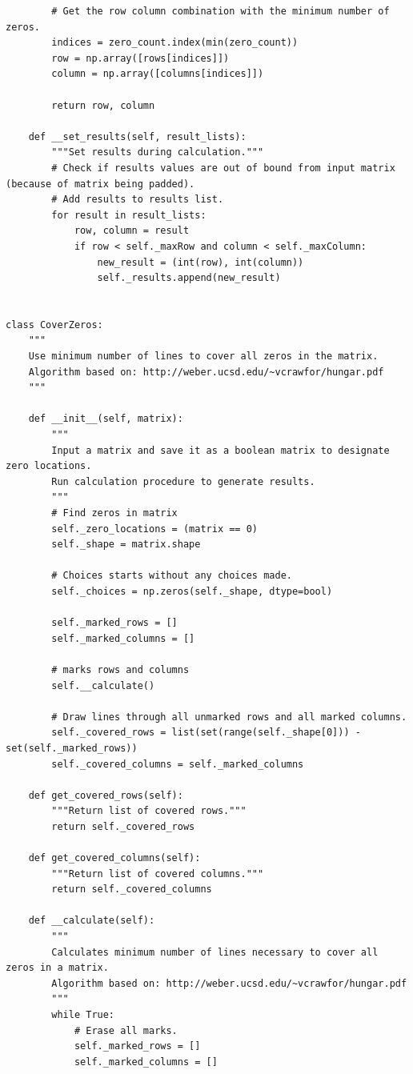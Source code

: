 \documentclass[12pt, letterpaper, twoside]{book}
\begin{document}
\begin{lstlisting}
        # Get the row column combination with the minimum number of zeros.
        indices = zero_count.index(min(zero_count))
        row = np.array([rows[indices]])
        column = np.array([columns[indices]])

        return row, column

    def __set_results(self, result_lists):
        """Set results during calculation."""
        # Check if results values are out of bound from input matrix (because of matrix being padded).
        # Add results to results list.
        for result in result_lists:
            row, column = result
            if row < self._maxRow and column < self._maxColumn:
                new_result = (int(row), int(column))
                self._results.append(new_result)


class CoverZeros:
    """
    Use minimum number of lines to cover all zeros in the matrix.
    Algorithm based on: http://weber.ucsd.edu/~vcrawfor/hungar.pdf
    """

    def __init__(self, matrix):
        """
        Input a matrix and save it as a boolean matrix to designate zero locations.
        Run calculation procedure to generate results.
        """
        # Find zeros in matrix
        self._zero_locations = (matrix == 0)
        self._shape = matrix.shape

        # Choices starts without any choices made.
        self._choices = np.zeros(self._shape, dtype=bool)

        self._marked_rows = []
        self._marked_columns = []

        # marks rows and columns
        self.__calculate()

        # Draw lines through all unmarked rows and all marked columns.
        self._covered_rows = list(set(range(self._shape[0])) - set(self._marked_rows))
        self._covered_columns = self._marked_columns

    def get_covered_rows(self):
        """Return list of covered rows."""
        return self._covered_rows

    def get_covered_columns(self):
        """Return list of covered columns."""
        return self._covered_columns

    def __calculate(self):
        """
        Calculates minimum number of lines necessary to cover all zeros in a matrix.
        Algorithm based on: http://weber.ucsd.edu/~vcrawfor/hungar.pdf
        """
        while True:
            # Erase all marks.
            self._marked_rows = []
            self._marked_columns = []


\end{lstlisting}
\end{document}
